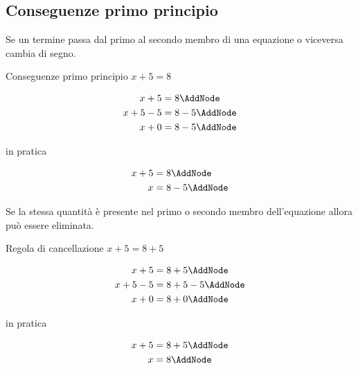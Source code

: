 \subsection{Conseguenze primo principio}
Se un termine passa  dal primo al secondo membro di una equazione o viceversa cambia di segno.
\begin{esempiot}{Conseguenze primo principio}{}
$ x+5 = 8$
\end{esempiot}
\begin{NodesList}
 \[ %
 \begin{aligned}
 x+5 &= 8 \AddNode\\
 x +5-5 &= 8-5 \AddNode\\
 x + 0 &= 8-5 \AddNode
 \end{aligned}
 \]
 \end{NodesList}
 in pratica
 \begin{NodesList}[dy=5pt,margin=3cm]
  \[ %
  \begin{aligned}
  x+5 &= 8 \AddNode\\
  x  &= 8-5 \AddNode
  \end{aligned}
  \]
  \end{NodesList}
Se la stessa quantità è presente nel primo o secondo membro dell'equazione allora può essere eliminata.
\begin{esempiot}{Regola di cancellazione}{}
$ x+5 = 8+5$
\end{esempiot}
\begin{NodesList}[dy=5pt,margin=3cm]
 \[ %
 \begin{aligned}
 x+5 &= 8+5 \AddNode\\
 x +5-5 &= 8+5-5 \AddNode\\
 x + 0 &= 8+0 \AddNode
 \end{aligned}
 \]
 \end{NodesList}
 in pratica
 \begin{NodesList}[dy=5pt,margin=3cm]
  \[ %
  \begin{aligned}
  x+5 &= 8+5 \AddNode\\
  x  &= 8 \AddNode
  \end{aligned}
  \]
  \end{NodesList}

